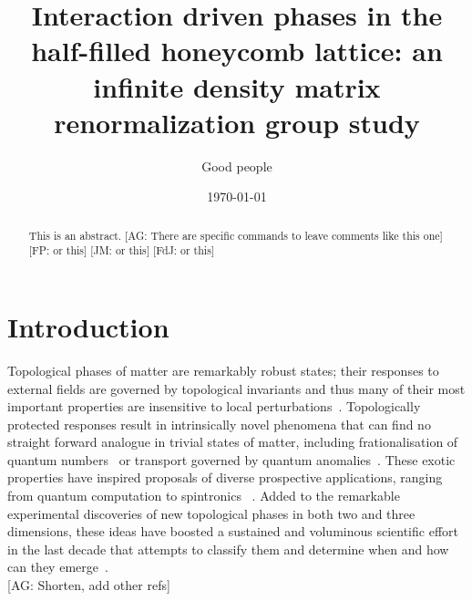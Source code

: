\documentclass[aps,prx,10pt,twocolumn,floatfix,superscriptaddress,showpacs,numerical,footinbib]{revtex4-1}
\newcommand{\noteAG}[1]{{\color{blue} [AG: #1]}}
\newcommand{\noteFP}[1]{{\color{magenta} [FP: #1]}}
\newcommand{\noteJM}[1]{{\color{red} [JM: #1]}}
\newcommand{\noteFdJ}[1]{{\color{cyan} [FdJ: #1]}}
\begin{document}
%
\title{Interaction driven phases in the half-filled honeycomb lattice: an infinite density matrix renormalization group study}
%
\author{Good people}
%
\date{\today}
%
\begin{abstract}
%
This is an abstract.
%
\noteAG{There are specific commands to leave comments like this one}\noteFP{or this}\noteJM{or this}\noteFdJ{or this}
%
\end{abstract}
%
\maketitle
%

\section{Introduction}
%
Topological phases of matter are remarkably robust states; their responses to external fields are
governed by topological invariants and thus many of their most important properties are insensitive to local perturbations~\cite{HK10,QZ11}.
%
Topologically protected responses result in intrinsically novel phenomena that can find no straight forward analogue in trivial states
of matter, including frationalisation of quantum numbers~\cite{Nayak2008} or transport governed by quantum anomalies~\cite{V03}.
%
These exotic properties have inspired proposals of diverse prospective applications, ranging from quantum computation to spintronics~\cite{HK10,QZ11,Nayak2008} .
%
Added to the remarkable experimental discoveries of new topological phases in both two and three dimensions,
these ideas have boosted a sustained and voluminous scientific effort in the last decade that attempts to classify them 
and determine when and how can they emerge~\cite{HK10,QZ11}.\\
\noteAG{Shorten, add other refs}
%
\end{document}
